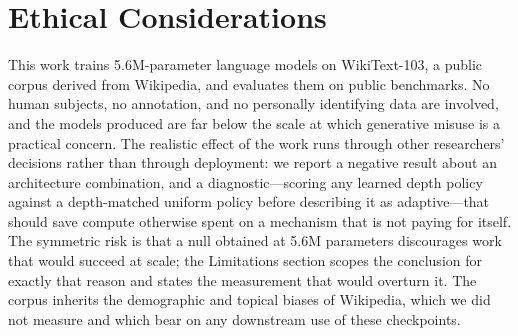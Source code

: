 \documentclass[11pt]{article}
\begin{document}


\section*{Ethical Considerations}
This work trains 5.6M-parameter language models on WikiText-103, a public corpus
derived from Wikipedia, and evaluates them on public benchmarks. No human
subjects, no annotation, and no personally identifying data are involved, and the
models produced are far below the scale at which generative misuse is a practical
concern. The realistic effect of the work runs through other researchers'
decisions rather than through deployment: we report a negative result about an
architecture combination, and a diagnostic---scoring any learned depth policy
against a depth-matched uniform policy before describing it as adaptive---that
should save compute otherwise spent on a mechanism that is not paying for itself.
The symmetric risk is that a null obtained at 5.6M parameters discourages work
that would succeed at scale; the Limitations section scopes the conclusion
for exactly that reason and states the measurement that would overturn it. The
corpus inherits the demographic and topical biases of Wikipedia, which we did not
measure and which bear on any downstream use of these checkpoints.



\end{document}
